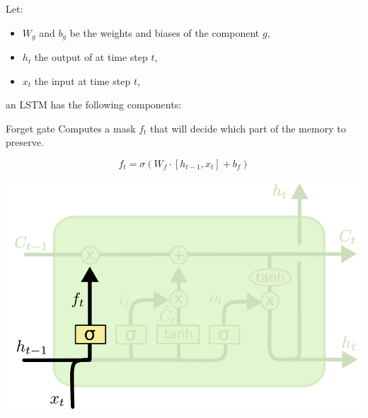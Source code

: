 Let:
\begin{itemize}
    \item $W_g$ and $b_g$ be the weights and biases of the component $g$,
    \item $h_t$ the output of at time step $t$,
    \item $x_t$ the input at time step $t$,
\end{itemize}
an LSTM has the following components:
\begin{descriptionlist}
    \item[Forget gate] 
        Computes a mask $f_t$ that will decide which part of the memory to preserve.\\
        \begin{minipage}{0.6\linewidth}
            \[ f_t = \sigma( W_f \cdot [h_{t-1}, x_t] + b_f) \]
        \end{minipage}
        \begin{minipage}{0.35\linewidth}
            \centering
            \includegraphics[width=0.85\linewidth]{./img/forget_gate.png}
        \end{minipage}


\end{descriptionlist}
